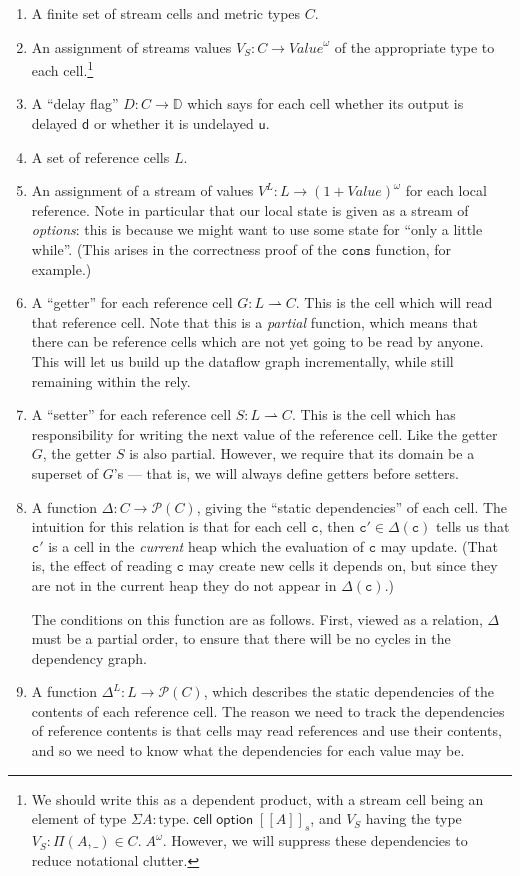 \documentclass[preprint]{sigplanconf}
\newcommand{\term}[1]{\ensuremath{\mathtt{{#1}}}}
\newcommand{\interps}[1]{[\![{#1}]\!]_s}
\newcommand{\celltype}[1]{\mathsf{cell}\;{#1}}
\newcommand{\opttype}[1]{\mathsf{option}\;{#1}}
\newcommand{\powerset}[1]{\mathcal{P}(#1)}
\newcommand{\Delays}{\mathbb{D}}
\newcommand{\U}{\mathsf{u}}
\newcommand{\D}{\mathsf{d}}
\begin{document}
\begin{enumerate}
\item A finite set of stream cells and metric types $C$. 
\item An assignment of streams values $V_S : C \to \mathit{Value}^\omega$ 
  of the appropriate type to each cell.\footnote{We should write this 
  as a dependent product, with a stream cell being an element of type 
  $\Sigma A:\mathrm{type}.\;\celltype{\opttype{\interps{A}}}$, and $V_S$ having
  the type $V_S : \Pi (A, \_) \in C.\; A^\omega$. However, we will suppress these 
  dependencies to reduce notational clutter.}
\item A ``delay flag'' $D : C \to \Delays$ which says for each cell whether 
  its output is delayed $\D$ or whether it is undelayed $\U$. 
\item A set of reference cells $L$. 
\item An assignment of a stream of values $V^L : L \to \mathit{(1 +
  \mathit{Value})^\omega}$ for each local reference. Note in
  particular that our local state is given as a stream of
  \emph{options}: this is because we might want to use some state for
  ``only a little while''. (This arises in the correctness proof of the 
  \term{cons} function, for example.)
\item A ``getter'' for each reference cell $G : L \rightharpoonup
  C$. This is the cell which will read that reference cell. Note that
  this is a \emph{partial} function, which means that there can be
  reference cells which are not yet going to be read by anyone. This
  will let us build up the dataflow graph incrementally, while still
  remaining within the rely. 
\item A ``setter'' for each reference cell $S : L \rightharpoonup
  C$. This is the cell which has responsibility for writing the next
  value of the reference cell. Like the getter $G$, the getter $S$ is
  also partial. However, we require that its domain be a superset of $G$'s ---
  that is, we will always define getters before setters. 

\item A function $\Delta : C \to \powerset{C}$, giving the ``static
  dependencies'' of each cell. The intuition for this relation is that
  for each cell \term{c}, then $\term{c'} \in \Delta(\term{c})$ tells
  us that \term{c'} is a cell in the \emph{current} heap which the
  evaluation of \term{c} may update. (That is, the effect of reading
  \term{c} may create new cells it depends on, but since they are not
  in the current heap they do not appear in $\Delta(\term{c})$.)

  The conditions on this function are as follows. First, viewed as a
  relation, $\Delta$ must be a partial order, to ensure that there
  will be no cycles in the dependency graph. 

\item A function $\Delta^L : L \to \powerset{C}$, which describes the 
  static dependencies of the contents of each reference cell. The reason
  we need to track the dependencies of reference contents is that 
  cells may read references and use their contents, and so we need to 
  know what the dependencies for each value may be. 
\end{enumerate}
\end{document}
